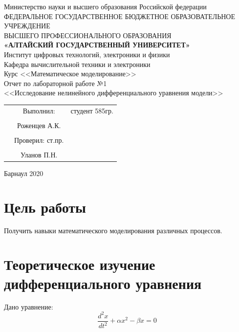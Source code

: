 \documentclass[14pt]{extarticle}
\begin{document}
\begin{center}
\hfill \break
\large{Министерство науки и высшего образования Российской федерации}\\
\footnotesize{ФЕДЕРАЛЬНОЕ ГОСУДАРСТВЕННОЕ БЮДЖЕТНОЕ ОБРАЗОВАТЕЛЬНОЕ УЧРЕЖДЕНИЕ}\\
\footnotesize{ВЫСШЕГО ПРОФЕССИОНАЛЬНОГО ОБРАЗОВАНИЯ}\\
\small{\textbf{«АЛТАЙСКИЙ ГОСУДАРСТВЕННЫЙ УНИВЕРСИТЕТ»}}\\
\hfill \break
\normalsize{Институт цифровых технологий, электроники и физики}\\
 \hfill \break
\normalsize{Кафедра вычислительной техники и электроники}\\
\hfill\break
\hfill \break
\hfill \break
\hfill \break
\large{Курс <<Математическое моделирование>>\\ Отчет по лабораторной работе №1\\ <<Исследование нелинейного дифференциального уравнения модели>>}\\
\end{center}
\hfill \break
\hfill \break
\hfill \break
\hfill \break
\hfill \break

\normalsize{
  \begin{flushright}
    \begin{tabular}{rcr}
      & Выполнил: & студент 585гр.\\\\
      & Роженцев А.К. &\underline{\hspace{3cm}}\\\\
      & Проверил: ст.пр.\\\\
      & Уланов П.Н. & \underline{\hspace{3cm}}
    \end{tabular}
  \end{flushright}
}
\hfill \break
\hfill \break
\hfill \break
\hfill \break
\hfill \break
\begin{center} Барнаул 2020 \end{center}
\thispagestyle{empty}
\newpage
\section{Цель работы}
Получить навыки математического моделирования различных процессов.

\section{Теоретическое изучение дифференциального уравнения}
Дано уравнение:
\begin{equation}
  \frac{d^2x}{dt^2}+\alpha{x^2}-\beta{x}=0
\end{equation}
\end{document}
